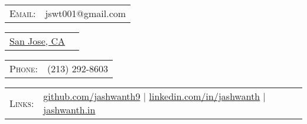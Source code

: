 \begin{tabular}{rl}
\textsc{Email:} & jswt001@gmail.com\\
\end{tabular}
\hfill
\begin{tabular}{rl}
 \href{https://www.google.com/maps/place/1031+Clyde+Ave,+Santa+Clara,+CA+95054/@37.388581,-121.9544597,17z/data=!3m1!4b1!4m5!3m4!1s0x808fc99cbad5f2e3:0x9687a9bebea9c8d8!8m2!3d37.388581!4d-121.952271}{San Jose, CA}\\
\end{tabular}
\hfill
\begin{tabular}{rl}
\textsc{\hspace{0.5cm}Phone:} & (213) 292-8603\\
\end{tabular}
%
\begin{tabular}{rl}
\textsc{Links:} & \href{http://github.com/jashwanth9}{github.com/jashwanth9} \hspace{.4cm}|\hspace{1.4cm} \href{http://linkedin.com/in/jashwanth}{linkedin.com/in/jashwanth} \hspace{1.6cm}|\hspace{1.5cm} \href{jashwanth.in}{jashwanth.in}
\end{tabular}
\vspace{5pt}

